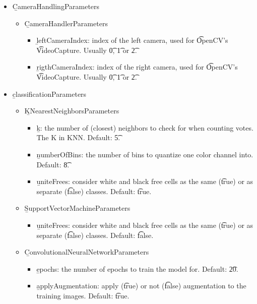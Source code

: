 \begin{itemize}
    \item \b{CameraHandlingParameters}
    \begin{itemize}
        \item \b{CameraHandlerParameters}
        \begin{itemize}
            \item \b{leftCameraIndex}: index of the left camera, used for \t{OpenCV}'s \t{VideoCapture}. Usually \t{0}, \t{1} or \t{2}.
            \item \b{rigthCameraIndex}: index of the right camera, used for \t{OpenCV}'s \t{VideoCapture}. Usually \t{0}, \t{1} or \t{2}.
        \end{itemize}
    \end{itemize}
    
    \item \b{classificationParameters}
    \begin{itemize}
        \item \b{KNearestNeighborsParameters}
        \begin{itemize}
            \item \b{k}: the number of (closest) neighbors to check for when counting votes. The K in KNN. Default: \t{5}.
            \item \b{numberOfBins}: the number of bins to quantize one color channel into. Default: \t{8}.
            \item \b{uniteFrees}: consider white and black free cells as the same (\t{true}) or as separate (\t{false}) classes. Default: \t{true}.
        \end{itemize}
        \item \b{SupportVectorMachineParameters}
        \begin{itemize}
            \item \b{uniteFrees}: consider white and black free cells as the same (\t{true}) or as separate (\t{false}) classes. Default: \t{false}.
        \end{itemize}
        \item \b{ConvolutionalNeuralNetworkParameters}
        \begin{itemize}
            \item \b{epochs}: the number of epochs to train the model for. Default: \t{20}.
            \item \b{applyAugmentation}: apply (\t{true}) or not (\t{false}) augmentation to the training images. Default: \t{true}.
        \end{itemize}
    \end{itemize}


\end{itemize}
